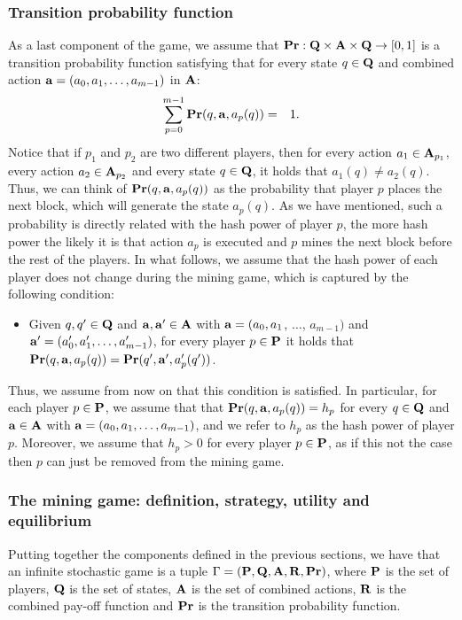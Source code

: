 \subsubsection{Transition probability function}\label{sub:transi}

As a last component of the game, we assume that $\mathbf{Pr} : \mathbf{Q} \times \mathbf{A} \times \mathbf{Q} \to [0,1]$ is a transition probability function satisfying that for every state $q \in \mathbf{Q}$ and combined action $\mathbf{a} = (a_0, a_1, \ldots, a_{m-1})$ in $\mathbf{A}$:
\begin{eqnarray*}\label{eq-prop}
\sum_{p=0}^{m-1} \mathbf{Pr}(q, \mathbf{a}, a_p(q)) & = & 1.
\end{eqnarray*}
Notice that if $p_1$ and $p_2$ are two different players, then for every action $a_1 \in \mathbf{A}_{p_1}$, every action $a_2 \in \mathbf{A}_{p_2}$ and every state $q \in \mathbf{Q}$, it holds that $a_1(q) \neq a_2(q)$. Thus, we can think of $\mathbf{Pr}(q, \mathbf{a}, a_p(q))$ as the probability that player $p$ places the next block, which will generate the state $a_p(q)$. As we have mentioned, such a probability is directly related with the hash power of player $p$, the more hash power the likely it is that action $a_p$ is executed and $p$ mines the next block before the rest of the players. In what follows, we assume that the hash power of each player does not change during the mining game, which is captured by the following condition:
\begin{itemize}
\item Given $q, q' \in \mathbf{Q}$ and $\mathbf{a}, \mathbf{a}' \in \mathbf{A}$ with $\mathbf{a} = (a_0, a_1$, $\ldots$, $a_{m-1})$ and $\mathbf{a}' = (a'_0, a'_1, \ldots, a'_{m-1})$, for every player $p \in \mathbf{P}$ it holds that $\mathbf{Pr}(q, \mathbf{a}, a_p(q)) = \mathbf{Pr}(q', \mathbf{a}', a'_p(q'))$.
\end{itemize}
Thus, we assume from now on that this condition is satisfied. In particular, for each player $p \in \mathbf{P}$, we assume that that
$\mathbf{Pr}(q, \mathbf{a}, a_p(q)) = h_p$ for every $q \in \mathbf{Q}$ and $\mathbf{a} \in \mathbf{A}$ with $\mathbf{a} = (a_0, a_1, \ldots, a_{m-1})$, and we refer to $h_p$ as the hash power of player $p$.
Moreover, we assume that $h_p > 0$ for every player $p \in \mathbf{P}$, as if this not the case then $p$ can just be removed from the mining game.


\subsubsection{The mining game: definition, strategy, utility and equilibrium}
Putting together the components defined in the previous sections, we have that 
an infinite stochastic game is a tuple $\Gamma = (\mathbf{P},\mathbf{Q},\mathbf{A},\mathbf{R},\mathbf{Pr})$, where $\mathbf{P}$ is the set of players, $\mathbf{Q}$ is the set of states, $\mathbf{A}$ is the set of combined actions, $\mathbf{R}$ is the combined pay-off function 
and $\mathbf{Pr}$ is the transition probability function. 

